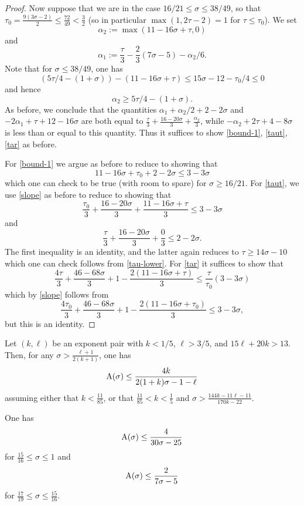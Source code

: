 \begin{proof}
Now suppose that we are in the case $16/21 \leq \sigma \leq 38/49$, so that $\tau_0 = \frac{9(3\sigma-2)}{2} \leq \frac{72}{49} < \frac{3}{2}$ (so in particular $\max(1,2\tau-2) = 1$ for $\tau \leq \tau_0$).  We set
$$ \alpha_2 := \max(11 - 16 \sigma + \tau,0)$$
and
$$ \alpha_1 := \frac{\tau}{3} - \frac{2}{3} (7\sigma-5) - \alpha_2/6.$$
Note that for $\sigma \leq 38/49$, one has
$$ (5\tau/4 - (1+\sigma)) - (11 - 16 \sigma + \tau) \leq 15\sigma - 12 - \tau_0/4 \leq 0$$
and hence
$$ \alpha_2 \geq 5\tau/4 - (1+\sigma).$$
As before, we conclude that the quantities $\alpha_1+\alpha_2/2 + 2-2\sigma$ and $-2\alpha_1 + \tau + 12 - 16 \sigma$ are both equal to $\frac{\tau}{3} + \frac{16-20\sigma}{3} + \frac{\alpha_2}{3}$, while $-\alpha_2 + 2\tau+4-8\sigma$ is less than or equal to this quantity.  Thus it suffices to show \eqref{bound-1}, \eqref{taut}, \eqref{tar} as before.

For \eqref{bound-1} we argue as before to reduce to showing that
$$ 11 - 16 \sigma + \tau_0 + 2 - 2 \sigma \leq 3 - 3\sigma$$
which one can check to be true (with room to spare) for $\sigma \geq 16/21$.  For \eqref{taut}, we use \eqref{slope} as before to reduce to showing that
$$ \frac{\tau_0}{3} + \frac{16-20\sigma}{3} + \frac{11 - 16 \sigma + \tau}{3} \leq 3 -3 \sigma$$
and
$$ \frac{\tau}{3} + \frac{16-20\sigma}{3} + \frac{0}{3} \leq 2 -2 \sigma.$$
The first inequality is an identity, and the latter again reduces to  $\tau \geq 14\sigma-10$ which one can check follows from \eqref{tau-lower}.  For \eqref{tar} it suffices to show that
$$ \frac{4\tau}{3} + \frac{46-68\sigma}{3}  + 1 - \frac{2(11 - 16 \sigma + \tau)}{3} \leq \frac{\tau}{\tau_0} (3-3\sigma)$$
which by \eqref{slope} follows from
$$ \frac{4\tau_0}{3} + \frac{46-68\sigma}{3}  + 1 - \frac{2(11 - 16 \sigma + \tau_0)}{3} \leq 3 - 3\sigma,$$
but this is an identity.
\end{proof}

\begin{theorem}\label{bourgain-zd}\cite[Proposition 3]{bourgain_remarks_1995}  Let $(k,\ell)$ be an exponent pair with $k < 1/5$, $\ell > 3/5$, and $15\ell + 20k > 13$.  Then, for any $\sigma > \frac{\ell+1}{2(k+1)}$, one has
    $$ \mathrm{A}(\sigma) \leq \frac{4k}{2(1+k)\sigma - 1 - \ell}$$
    assuming either that $k < \frac{11}{85}$, or that $\frac{11}{85} < k < \frac{1}{5}$ and $\sigma > \frac{144k-11\ell-11}{170k-22}$.
\end{theorem}

\begin{corollary}\label{bourgain-zero-density}\cite[Corollary 4]{bourgain_remarks_1995}  One has
    $$ \mathrm{A}(\sigma) \leq \frac{4}{30\sigma-25}$$
    for $\frac{15}{16} \leq \sigma \leq 1$
    and
    $$ \mathrm{A}(\sigma) \leq \frac{2}{7\sigma-5}$$
    for $\frac{17}{19} \leq \sigma \leq \frac{15}{16}$.
\end{corollary}

